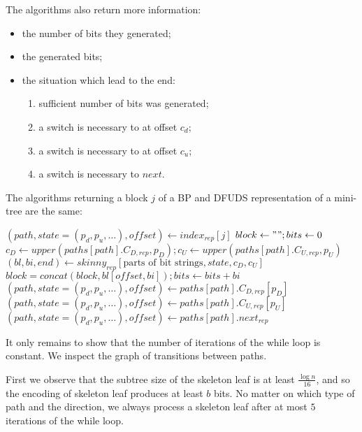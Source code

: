 The algorithms also return more information:
\begin{itemize}
	\item the number of bits they generated;
	\item the generated bits;
	\item the situation which lead to the end:
	\begin{enumerate}
		\item sufficient number of bits was generated;
		\item a switch is necessary to at offset $c_d$;
		\item a switch is necessary to at offset $c_u$;
		\item a switch is necessary to $next$.
	\end{enumerate}
\end{itemize}

The algorithms returning a block $j$ of a BP and DFUDS representation of a mini-tree are the same:

\begin{algorithmic}
	\State $(path, state=(p_d, p_u, \ldots), offset) \gets index_{rep}[j]$
	\State $block \gets ""; bits \gets 0$
		\State $c_D \gets upper(paths[path].C_{D, rep}, p_D); c_U \gets upper(paths[path].C_{U, rep}, p_U)$
		\State $(bl, bi, end) \gets skinny_{rep}[\textrm{parts of bit strings}, state, c_D, c_U]$
		\State $block = concat(block, bl[offset, bi]); bits \gets bits + bi$
			\State $(path, state=(p_d, p_u, \ldots), offset) \gets paths[path].C_{D, rep}[p_D]$
			\State $(path, state=(p_d, p_u, \ldots), offset) \gets paths[path].C_{U, rep}[p_U]$
				\State \Break
			\Else
				\State $(path, state=(p_d, p_u, \ldots), offset) \gets paths[path].next_{rep}$
			\EndIf
		\EndIf
	\EndWhile
	\State {}
\EndFunction
\end{algorithmic}

It only remains to show that the number of iterations of the while loop is constant.
We inspect the graph of transitions between paths.


First we observe that the subtree size of the skeleton leaf is at least $\frac{\log n}{16}$, and so the encoding of skeleton leaf produces at least $b$ bits.
No matter on which type of path and the direction, we always process a skeleton leaf after at most $5$ iterations of the while loop.

